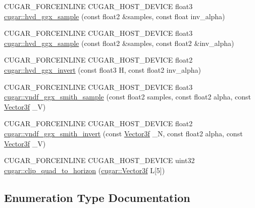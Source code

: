 \begin{DoxyCompactItemize}
\item 
C\+U\+G\+A\+R\+\_\+\+F\+O\+R\+C\+E\+I\+N\+L\+I\+NE C\+U\+G\+A\+R\+\_\+\+H\+O\+S\+T\+\_\+\+D\+E\+V\+I\+CE float3 \hyperlink{group___b_s_d_f_module_ga49eab615e64e73c409bb285fd95c56c3}{cugar\+::hvd\+\_\+ggx\+\_\+sample} (const float2 \&samples, const float inv\+\_\+alpha)
\item 
C\+U\+G\+A\+R\+\_\+\+F\+O\+R\+C\+E\+I\+N\+L\+I\+NE C\+U\+G\+A\+R\+\_\+\+H\+O\+S\+T\+\_\+\+D\+E\+V\+I\+CE float3 \hyperlink{group___b_s_d_f_module_gaa94fad7af98e50d2b2abe6801df8bd93}{cugar\+::hvd\+\_\+ggx\+\_\+sample} (const float2 \&samples, const float2 \&inv\+\_\+alpha)
\item 
C\+U\+G\+A\+R\+\_\+\+F\+O\+R\+C\+E\+I\+N\+L\+I\+NE C\+U\+G\+A\+R\+\_\+\+H\+O\+S\+T\+\_\+\+D\+E\+V\+I\+CE float2 \hyperlink{group___b_s_d_f_module_ga009dbdc5ba0035fc161335607c2b328d}{cugar\+::hvd\+\_\+ggx\+\_\+invert} (const float3 H, const float2 inv\+\_\+alpha)
\item 
C\+U\+G\+A\+R\+\_\+\+F\+O\+R\+C\+E\+I\+N\+L\+I\+NE C\+U\+G\+A\+R\+\_\+\+H\+O\+S\+T\+\_\+\+D\+E\+V\+I\+CE float3 \hyperlink{group___b_s_d_f_module_gaae32e76bc82f281f61485ea552aba53a}{cugar\+::vndf\+\_\+ggx\+\_\+smith\+\_\+sample} (const float2 samples, const float2 alpha, const \hyperlink{structcugar_1_1_vector}{Vector3f} \+\_\+V)
\item 
C\+U\+G\+A\+R\+\_\+\+F\+O\+R\+C\+E\+I\+N\+L\+I\+NE C\+U\+G\+A\+R\+\_\+\+H\+O\+S\+T\+\_\+\+D\+E\+V\+I\+CE float2 \hyperlink{group___b_s_d_f_module_gabe2116f566e70937f1abb126140afae8}{cugar\+::vndf\+\_\+ggx\+\_\+smith\+\_\+invert} (const \hyperlink{structcugar_1_1_vector}{Vector3f} \+\_\+N, const float2 alpha, const \hyperlink{structcugar_1_1_vector}{Vector3f} \+\_\+V)
\item 
C\+U\+G\+A\+R\+\_\+\+F\+O\+R\+C\+E\+I\+N\+L\+I\+NE C\+U\+G\+A\+R\+\_\+\+H\+O\+S\+T\+\_\+\+D\+E\+V\+I\+CE uint32 \hyperlink{group___b_s_d_f_module_ga0ddbffc856042ea191e9ed868fe58ca9}{cugar\+::clip\+\_\+quad\+\_\+to\+\_\+horizon} (\hyperlink{structcugar_1_1_vector}{cugar\+::\+Vector3f} L\mbox{[}5\mbox{]})
\end{DoxyCompactItemize}


\subsection{Enumeration Type Documentation}
\mbox{\label{group___b_s_d_f_module_gaca1e72535e7f260e54ed8bbf984dade9}} 
